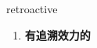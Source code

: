 
\begin{frame}
{\huge retroactive}
\begin{center}
\begin{enumerate}\Large
  \item \textbf{有追溯效力的}
\end{enumerate}
\end{center}
\end{frame}
